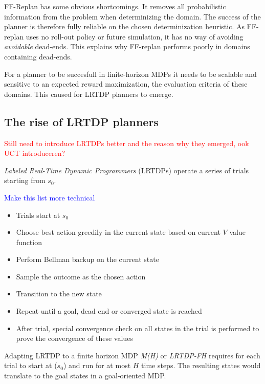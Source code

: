 \documentclass[runningheads,a4paper]{llncs}
\newcommand\myworries[1]{\textcolor{red}{#1}}
\newcommand\todo[1]{\textcolor{blue}{#1}}
\begin{document}
FF-Replan has some obvious shortcomings. It removes all probabilistic information from the problem when determinizing the domain. The success of the planner is therefore fully reliable on the chosen determinization heuristic. As FF-replan uses no roll-out policy or future simulation, it has no way of avoiding \emph{avoidable} dead-ends. This explains why FF-replan performs poorly in domains containing dead-ends. 

For a planner to be succesfull in finite-horizon MDPs it needs to be scalable and sensitive to an expected reward maximization, the evaluation criteria of these domains. This caused for  LRTDP planners to emerge.


\subsection{The rise of LRTDP planners}

\myworries{Still need to introduce LRTDPs better and the reason why they emerged, ook UCT introduceren?}

\emph{Labeled Real-Time Dynamic Programmers} (LRTDPs) operate a series of trials starting from $s_0$.

\todo{Make this list more technical}

\begin{itemize}
	\item Trials start at $s_0$
	\item Choose best action greedily in the current state based on current $V$ value function
	\item Perform Bellman backup on the current state
	\item Sample the outcome as the chosen action
	\item Transition to the new state
	\item Repeat until a goal, dead end or converged state is reached
	\item After trial, special convergence check on all states in the trial is performed to prove the convergence of these values
\end{itemize}

Adapting LRTDP to a finite horizon MDP \emph{M(H)} or \emph{LRTDP-FH} requires for each trial to start at ($s_0$) and run for at most $H$ time steps. The resulting states would translate to the goal states in a goal-oriented MDP. \\
\end{document}
